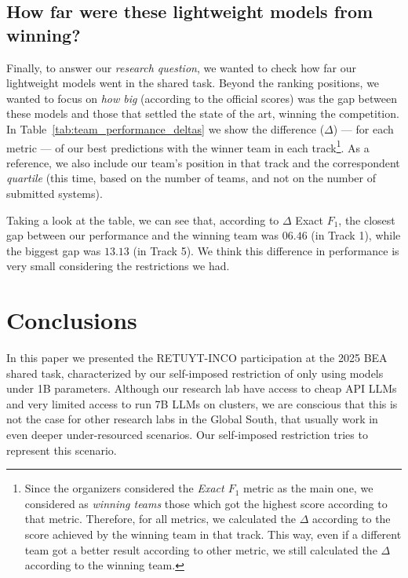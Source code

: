 \documentclass[11pt]{article}
\begin{document}
\subsection{How far were these lightweight models from winning?}

Finally, to answer our \textit{research question}, we wanted to check how far our lightweight models went in the shared task.
Beyond the ranking positions, we wanted to focus on \textit{how big} (according to the official scores) was the gap between these models and those that settled the state of the art, winning the competition.
In Table~\ref{tab:team_performance_deltas} we show the difference ($\Delta$) --- for each metric --- of our best predictions with the winner team in each track\footnote{
Since the organizers considered the \textit{Exact $F_1$} metric as the main one, we considered as \textit{winning teams} those which got the highest score according to that metric.
Therefore, for all metrics, we calculated the $\Delta$ according to the score achieved by the winning team in that track. This way, even if a different team got a better result according to other metric, we still calculated the $\Delta$ according to the winning team.
}.
As a reference, we also include our team's position in that track and the correspondent \textit{quartile} (this time, based on the number of teams, and not on the number of submitted systems).






Taking a look at the table, we can see that, according to $\Delta$ Exact $F_1$, the closest gap between our performance and the winning team was $06.46$ (in Track 1), while the biggest gap was $13.13$ (in Track 5).
We think this difference in performance is very small considering the restrictions we had.




\section{Conclusions}
\label{sec:conclusions}


In this paper we presented the RETUYT-INCO participation at the 2025 BEA shared task, characterized by our self-imposed restriction of only using models under 1B parameters.
Although our research lab have access to cheap API LLMs and very limited access to run 7B LLMs on clusters, we are conscious that this is not the case for other research labs in the Global South, that usually work in even deeper under-resourced scenarios.
Our self-imposed restriction tries to represent this scenario.
\end{document}
